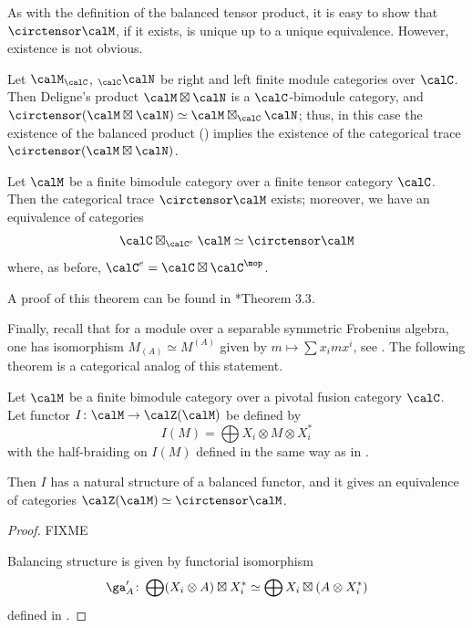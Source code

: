As with the definition of the balanced tensor product, it is easy to show that
$\circtensor \calM$, if it exists, is unique up to a unique equivalence. However,
existence is not obvious.

\begin{example}\label{x:trace-deligne-product}
  Let $\calM_\calC$, ${}_\calC \calN$ be right and left finite module
  categories over $\calC$. Then Deligne's product $\calM\boxtimes \calN$ is
  a $\calC$-bimodule category, and $\circtensor (\calM\boxtimes \calN)\simeq
  \calM\boxtimes_\calC\calN$; thus, in this case the existence of the balanced product
  () implies the existence of the categorical trace
  $\circtensor (\calM\boxtimes\calN)$.
\end{example}
\begin{theorem}\label{t:cat-trace}
  Let $\calM$ be a finite bimodule category over a finite tensor category
  $\calC$. Then the categorical trace $\circtensor \calM$ exists;
  moreover, we have an equivalence of categories
  $$
    \calC\boxtimes_{\calC^e} \calM \simeq \circtensor \calM
  $$
  where, as before, $\calC^e=\calC\boxtimes\calC^\mop$.
\end{theorem}
  A proof of this theorem can be found in
  *{Theorem 3.3}.


Finally, recall that for a module over a separable symmetric Frobenius algebra,
one has isomorphism $M_{(A)}\simeq M^{(A)}$ given by $m\mapsto \sum x_imx^i$,
see . The following theorem is a categorical analog of
this statement.

\begin{theorem}\label{t:category-inv-coinv}
  Let $\calM$ be a finite bimodule category over a pivotal fusion
  category  $\calC$. Let functor $I\colon \calM\to \calZ(\calM)$ be defined by
  \begin{equation}
    I(M)= \bigoplus X_i\otimes M\otimes X_i^*
  \end{equation}
  with the half-braiding on $I(M)$ defined in the same way as in
  .

  Then $I$ has a natural structure of a balanced functor, and it
  gives an equivalence of categories $\calZ(\calM)\simeq \circtensor \calM$.
\end{theorem}
\begin{proof}
    FIXME

    Balancing structure is given by functorial isomorphism
    $$
    \ga'_A\colon \bigoplus (X_i\otimes A) \boxtimes X_i^* \simeq
              \bigoplus X_i \boxtimes (A\otimes X_i^*)
    $$
    defined in .
\end{proof}